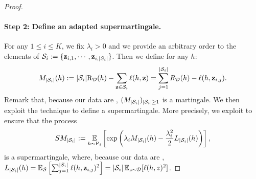\begin{noaddcontents}
\begin{proof}
    \paragraph{Step 2: Define an adapted supermartingale. }
        For any $1\leq i \leq K$, we fix $\lambda_i>0$ and we provide an arbitrary order to the elements of $\S_i\defeq \{\z_{i,1},\cdots,\z_{i,|S_i|}\}$. Then we define for any $h$: 
        \begin{align*}
        M_{|\S_i|}(h)\defeq   |\S_i|\Risk_{\D}(h) - \sum_{\z\in\S_i} \loss(h, \z) = \sum_{j=1}^{|\S_i|} R_\D(h) - \loss(h,\z_{i,j}).
        \end{align*}
        Remark that, because our data are \iid, $(M_{|\S_i|})_{|\S_i|\geq 1}$ is a martingale. 
        We then exploit the technique \cite{chugg2023unified} to define a supermartingale. 
        More precisely, we exploit \cite[][Lemma A.2 and Lemma B.1]{chugg2023unified} to ensure that the process
        \begin{align*}
        SM_{|\S_i|} \defeq \EE_{h\sim \P_i} \LB\exp\left(\lambda_i M_{|\S_i|}(h) - \frac{\lambda_i^2}{2} L_{|\S_i|}(h) \right)\RB,
        \end{align*}
        is a supermartingale, where, because our data are \iid,  $L_{|\S_i|}(h) = \EE_{\S} \LB \sum_{j=1}^{|S_i|}\loss(h,\z_{i,j})^2 \RB = |\S_i| \EE_{z\sim \D}[\loss(h,z)^2]$. 
    

\end{proof}
\end{noaddcontents}
